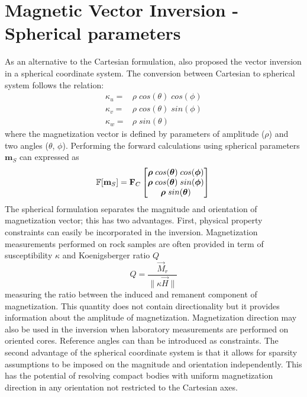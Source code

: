 \section{Magnetic Vector Inversion - Spherical parameters}
As an alternative to the Cartesian formulation, \cite{LelievreOldenburg2009} also proposed the vector inversion in a spherical coordinate system.
The conversion between Cartesian to spherical system follows the relation:
\begin{equation}\label{eq:Cart_to_Spherical}
\begin{split}
\kappa_u = & \rho \; cos(\theta)\;cos(\phi) \\
\kappa_v = & \rho \; cos(\theta)\;sin(\phi) \\
\kappa_w = & \rho \; sin(\theta)
\end{split}
\end{equation}
where the magnetization vector is defined by parameters of amplitude (${\rho}$) and two angles (${\theta}$, ${\phi}$). Performing the forward calculations using spherical parameters $\mathbf{m}_S$ can expressed as
\begin{equation}
\mathbb{F}[\mathbf{m}_S] = \mathbf{F}_C
\begin{bmatrix}
\boldsymbol{\rho} \; cos(\boldsymbol{\theta})\;cos(\boldsymbol{\phi}) \\
\boldsymbol{\rho} \; cos(\boldsymbol{\theta})\;sin(\boldsymbol{\phi}) \\
\boldsymbol{\rho} \; sin(\boldsymbol{\theta})
\end{bmatrix} \\
\end{equation}
The spherical formulation separates the magnitude and orientation of magnetization vector; this has two advantages. First, physical property constraints can easily be incorporated in the inversion. Magnetization measurements performed on rock samples are often provided in term of susceptibility $\kappa$ and Koenigsberger ratio $Q$
\begin{equation}
Q = \frac{\vec M_{r}}{\| \kappa \vec H\|}
\end{equation}
measuring the ratio between the induced and remanent component of magnetization. This quantity does not contain directionality but it provides information about the amplitude of magnetization. Magnetization direction may also be used in the inversion when laboratory measurements are performed on oriented cores. Reference angles can than be introduced as constraints.
The second advantage of the spherical coordinate system is that it allows for sparsity assumptions to be  imposed on the magnitude and orientation independently. This has the potential of resolving compact bodies with uniform magnetization direction in any orientation not restricted to the Cartesian axes.

